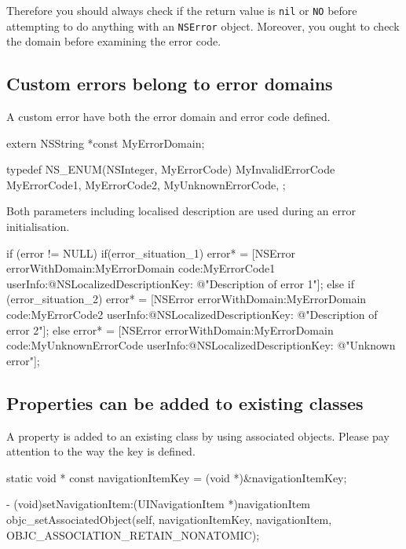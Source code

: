 \documentclass[10pt]{extarticle}
\newenvironment{codelisting}
{\footnotesize\mdframed[middlelinewidth=0.5pt, middlelinecolor=BaliHaiColor, skipabove=15pt]\verbatim}
{\endverbatim\endmdframed\vspace{12pt}\normalsize}
\newcommand{\inlinecode}[1]{{\textcolor{TundoraColor}{\texttt{#1}}}}
\begin{document}
Therefore you should always check if the return value is \inlinecode{nil} or \inlinecode{NO} before attempting to do anything with an \inlinecode{NSError} object. Moreover, you ought to check the domain before examining the error code.


\subsection{Custom errors belong to error domains}

A custom error have both the error domain and error code defined.

\begin{codelisting}
extern NSString *const MyErrorDomain;

typedef NS_ENUM(NSInteger, MyErrorCode) {
    MyInvalidErrorCode
    MyErrorCode1,
    MyErrorCode2,
    MyUnknownErrorCode,
};
\end{codelisting}

Both parameters including localised description are used during an error initialisation.

\begin{codelisting}
if (error != NULL) {
    if(error_situation_1) {
        error* = [NSError errorWithDomain:MyErrorDomain 
                                     code:MyErrorCode1
                                 userInfo:@{NSLocalizedDescriptionKey: @"Description of error 1"}];
    }
    else if (error_situation_2) {
        error* = [NSError errorWithDomain:MyErrorDomain 
                                     code:MyErrorCode2
                                 userInfo:@{NSLocalizedDescriptionKey: @"Description of error 2"}];
    }
    else {
        error* = [NSError errorWithDomain:MyErrorDomain 
                                     code:MyUnknownErrorCode
                                 userInfo:@{NSLocalizedDescriptionKey: @"Unknown error"}];
    }
}
\end{codelisting}


\subsection{Properties can be added to existing classes}

A property is added to an existing class by using associated objects. Please pay attention to the way the key is defined.

\begin{codelisting}
static void * const navigationItemKey = (void *)&navigationItemKey;

- (void)setNavigationItem:(UINavigationItem *)navigationItem
{
    objc_setAssociatedObject(self, 
                             navigationItemKey, 
                             navigationItem, 
                             OBJC_ASSOCIATION_RETAIN_NONATOMIC);
}
\end{codelisting}
\end{document}
